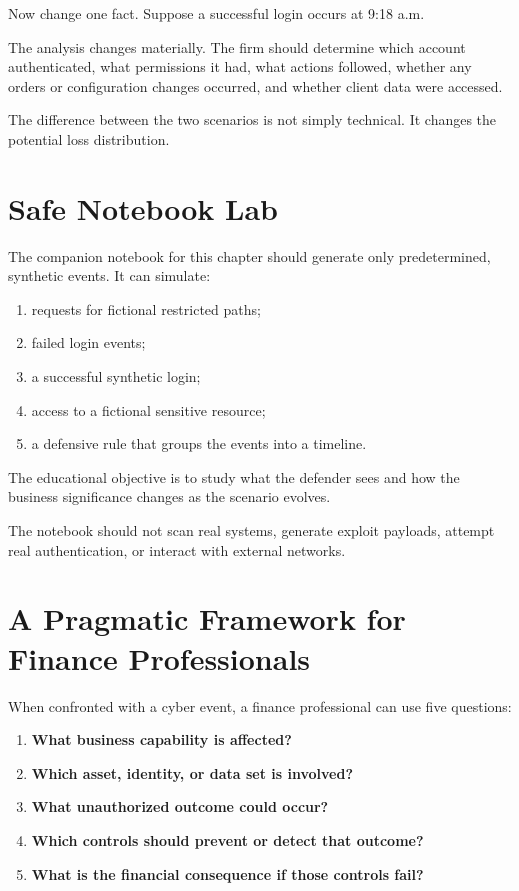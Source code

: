 Now change one fact. Suppose a successful login occurs at 9:18 a.m.

The analysis changes materially. The firm should determine which account authenticated, what permissions it had, what actions followed, whether any orders or configuration changes occurred, and whether client data were accessed.

The difference between the two scenarios is not simply technical. It changes the potential loss distribution.

\section{Safe Notebook Lab}

\begin{notebooklab}
The companion notebook for this chapter should generate only predetermined, synthetic events. It can simulate:

\begin{enumerate}
    \item requests for fictional restricted paths;
    \item failed login events;
    \item a successful synthetic login;
    \item access to a fictional sensitive resource;
    \item a defensive rule that groups the events into a timeline.
\end{enumerate}

The educational objective is to study what the defender sees and how the business significance changes as the scenario evolves.

The notebook should not scan real systems, generate exploit payloads, attempt real authentication, or interact with external networks.
\end{notebooklab}

\section{A Pragmatic Framework for Finance Professionals}

When confronted with a cyber event, a finance professional can use five questions:

\begin{enumerate}
    \item \textbf{What business capability is affected?}
    \item \textbf{Which asset, identity, or data set is involved?}
    \item \textbf{What unauthorized outcome could occur?}
    \item \textbf{Which controls should prevent or detect that outcome?}
    \item \textbf{What is the financial consequence if those controls fail?}
\end{enumerate}

